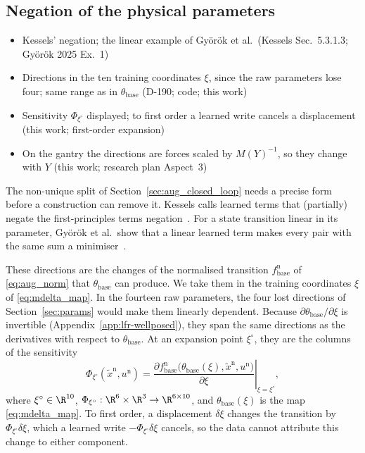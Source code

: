 \subsection{Negation of the physical parameters}\label{sec:obc_negation}
\ifdraft
\begin{itemize}
\item Kessels' negation; the linear example of Gy\"or\"ok et al.\ (Kessels Sec.~5.3.1.3; Gy\"or\"ok 2025 Ex.~1)
\item Directions in the ten training coordinates $\xi$, since the raw parameters lose four; same range as in $\theta_{\mathrm{base}}$ (D-190; code; this work)
\item Sensitivity $\Phi_{\xi^\circ}$ displayed; to first order a learned write cancels a displacement (this work; first-order expansion)
\item On the gantry the directions are forces scaled by $M(Y)^{-1}$, so they change with $Y$ (this work; research plan Aspect~3)
\end{itemize}
\fi

The non-unique split of Section~\ref{sec:aug_closed_loop} needs a precise form
before a construction can remove it.
Kessels calls learned terms that (partially) negate the first-principles terms
negation~\cite[Sec.~5.3.1.3]{kessels2025ai}.
For a state transition linear in its parameter, Gy\"or\"ok et al.\ show that a
linear learned term makes every pair with the same sum a
minimiser~\cite[Ex.~1]{gyorok2025l4dc}.

These directions are the changes of the normalised transition
$f^{\mathrm n}_{\mathrm{base}}$ of \eqref{eq:aug_norm} that $\theta_{\mathrm{base}}$
can produce.
We take them in the training coordinates $\xi$ of \eqref{eq:mdelta_map}.
In the fourteen raw parameters, the four lost directions of
Section~\ref{sec:params} would make them linearly dependent.
Because $\partial\theta_{\mathrm{base}}/\partial\xi$ is invertible
(Appendix~\ref{app:lfr-wellposed}), they span the same directions as the
derivatives with respect to $\theta_{\mathrm{base}}$.
At an expansion point $\xi^\circ$, they are the columns of the sensitivity
\begin{equation}
 \Phi_{\xi^\circ}(\tilde x^{\mathrm n},u^{\mathrm n})
 =\left.\frac{\partial f^{\mathrm n}_{\mathrm{base}}\bigl(\theta_{\mathrm{base}}(\xi),
   \tilde x^{\mathrm n},u^{\mathrm n}\bigr)}{\partial\xi}\right|_{\xi=\xi^\circ},
 \label{eq:obc_sens}
\end{equation}
where $\xi^\circ\in\R^{10}$, $\Phi_{\xi^\circ}:\R^6\times\R^3\to\R^{6\times10}$,
and $\theta_{\mathrm{base}}(\xi)$ is the map \eqref{eq:mdelta_map}.
To first order, a displacement $\delta\xi$ changes the transition by
$\Phi_{\xi^\circ}\delta\xi$, which a learned write $-\Phi_{\xi^\circ}\delta\xi$
cancels, so the data cannot attribute this change to either component.

